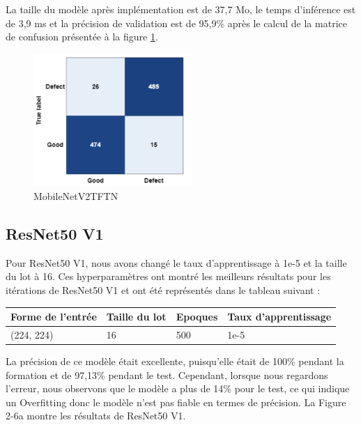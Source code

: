 La taille du modèle après implémentation est de 37,7 Mo, le temps d'inférence est de 3,9 ms et la précision de validation est de 95,9\% après le calcul de la matrice de confusion présentée à la figure \ref{MobileNetV2TFTN}.

\begin{figure}[h]
    \centering
    \includegraphics[width=6cm]{assets/PartTwo/ChapterTwo/MobileNetV2TFTN.png}
    \caption{MobileNetV2TFTN}
    \label{MobileNetV2TFTN}
    \end{figure}
\newpage
\subsection{ResNet50 V1 }
Pour ResNet50 V1, nous avons changé le taux d'apprentissage à 1e-5 et la taille du lot à 16. Ces hyperparamètres ont montré les meilleurs résultats pour les itérations de ResNet50 V1 et ont été représentés dans le tableau  suivant : 

\begin{table}[h]
    \begin{center}
        \begin{tabular}{|l|l|l|l|}
            \hline
            Forme de l'entrée & Taille du lot & Epoques & Taux d'apprentissage \\ \hline
            (224, 224)        & 16            & 500     & 1e-5                 \\ \hline
            \end{tabular}
    \end{center}
    \end{table}
    La précision de ce modèle était excellente, puisqu'elle était de 100\% pendant la formation et de 97,13\% pendant le test. Cependant, lorsque nous regardons l'erreur, nous observons que le modèle a plus de 14\% pour le test, ce qui indique un Overfitting donc le modèle n'est pas fiable en termes de précision. La Figure 2-6a montre les résultats de ResNet50 V1. 

